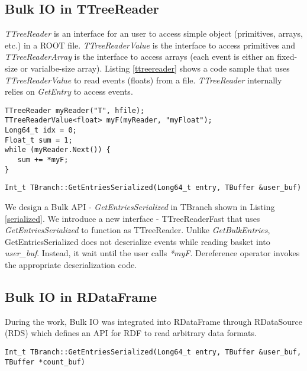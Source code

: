 \subsection{Bulk IO in TTreeReader}

\textit{TTreeReader} is an interface for an user to access simple object (primitives, arrays, etc.) in a ROOT file. \textit{TTreeReaderValue} is the interface to access primitives and \textit{TTreeReaderArray} is the interface to access arrays (each event is either an fixed-size or varialbe-size array). Listing \ref{ttreereader} shows a code sample that uses \textit{TTreeReaderValue} to read events (floats) from a file. \textit{TTreeReader} internally relies on \textit{GetEntry} to access events.
\vspace{5pt}
\lstset{xleftmargin=0.15\textwidth,xrightmargin=0.04\textwidth
}
\begin{lstlisting}[caption={Access to Events using TTreeReader.},captionpos=b,label={ttreereader}]
TTreeReader myReader("T", hfile);
TTreeReaderValue<float> myF(myReader, "myFloat");
Long64_t idx = 0; 
Float_t sum = 1; 
while (myReader.Next()) { 
   sum += *myF;
}
\end{lstlisting}

\vspace{5pt}

\lstset{xleftmargin=0\textwidth,xrightmargin=0\textwidth,basicstyle=\footnotesize\ttfamily,breaklines=true}
\begin{lstlisting}[caption={Bulk API in TTreeReaderFast.},captionpos=b,label={serialized}]
Int_t TBranch::GetEntriesSerialized(Long64_t entry, TBuffer &user_buf)
\end{lstlisting}

We design a Bulk API - \textit{GetEntriesSerialized} in TBranch shown in Listing \ref{serialized}. We introduce a new interface - TTreeReaderFast that uses \textit{GetEntriesSerialized} to function as TTreeReader. Unlike \textit{GetBulkEntries}, GetEntriesSerialized does not deserialize events while reading basket into \textit{user\_buf}. Instead, it wait until the user calls \textit{*myF}. Dereference operator invokes the appropriate deserialization code. 

\subsection{Bulk IO in RDataFrame}

During  the work, Bulk IO was integrated into RDataFrame \cite{rdataframe} through RDataSource (RDS) which defines an API for RDF to read arbitrary data formats.
\vspace{5pt}
\lstset{basicstyle=\ttfamily,xleftmargin=0.1\textwidth,xrightmargin=0.1\textwidth,breaklines=true}
\begin{lstlisting}[caption={Bulk API in RDataFrame.},captionpos=b,
label={serializedcount}]
Int_t TBranch::GetEntriesSerialized(Long64_t entry, TBuffer &user_buf, TBuffer *count_buf)
\end{lstlisting}

